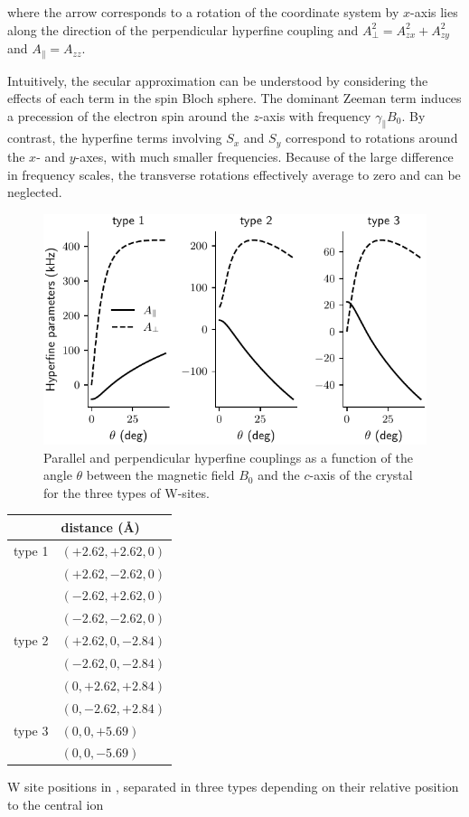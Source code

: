 \noindent where the arrow corresponds to a rotation of the coordinate system by $x$-axis lies along the direction of the perpendicular hyperfine coupling and $A_\perp^2 = A_{zx}^2+A_{zy}^2$ and $A_\parallel = A_{zz}$.

Intuitively, the secular approximation can be understood by considering the effects of each term in the \Er spin Bloch sphere. The dominant Zeeman term induces a precession of the electron spin around the $z$-axis with frequency $\gamma_\parallel B_0$. By contrast, the hyperfine terms involving $S_x$ and $S_y$ correspond to rotations around the $x$- and $y$-axes, with much smaller frequencies. Because of the large difference in frequency scales, the transverse rotations effectively average to zero and can be neglected.

\begin{figure}
    \includegraphics{chapter2/figures/hyperfine_tensor_vs_angle.pdf}
    \caption[Hyperfine coupling parameter]{Parallel and perpendicular hyperfine couplings as a function of the angle $\theta$ between the magnetic field $B_0$ and the $c$-axis of the crystal for the three types of W-sites.}
\end{figure}


\begin{margintable}[]
\begin{tabular}{l|l}
       & distance (\AA) \\ \hline
type 1 & $(+2.62, +2.62,  0) $           \\
       & $(+2.62, -2.62,  0)  $          \\
       & $(-2.62, +2.62,  0)$            \\
       & $(-2.62, -2.62,  0)$            \\ \hline
type 2 & $(+2.62,  0, -2.84)$            \\
       & $(-2.62,  0, -2.84)$            \\
       & $(0, +2.62, +2.84)$             \\
       & $(0, -2.62, +2.84)$             \\ \hline
type 3 & $(0, 0, +5.69)$                 \\
       & $(0, 0, -5.69)$                
\end{tabular}
\caption[\W atomic positions]{W site positions in \Ca, separated in three types depending on their relative position to the central \Er ion}
\end{margintable}

